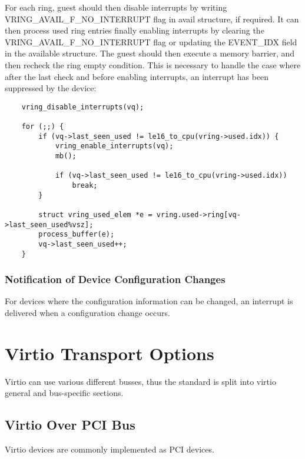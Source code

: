 For each ring, guest should then disable interrupts by writing
VRING_AVAIL_F_NO_INTERRUPT flag in avail structure, if required.
It can then process used ring entries finally enabling interrupts
by clearing the VRING_AVAIL_F_NO_INTERRUPT flag or updating the
EVENT_IDX field in the available structure.  The guest should then
execute a memory barrier, and then recheck the ring empty
condition. This is necessary to handle the case where after the
last check and before enabling interrupts, an interrupt has been
suppressed by the device:

\begin{lstlisting}
	vring_disable_interrupts(vq);

	for (;;) {
		if (vq->last_seen_used != le16_to_cpu(vring->used.idx)) {
			vring_enable_interrupts(vq);
			mb();

			if (vq->last_seen_used != le16_to_cpu(vring->used.idx))
				break;
		}

		struct vring_used_elem *e = vring.used->ring[vq->last_seen_used%vsz];
		process_buffer(e);
		vq->last_seen_used++;
	}
\end{lstlisting}

\subsection{Notification of Device Configuration Changes}\label{sec:General Initialization And Device Operation / Device Operation / Notification of Device Configuration Changes}

For devices where the configuration information can be changed, an
interrupt is delivered when a configuration change occurs.



\chapter{Virtio Transport Options}\label{sec:Virtio Transport Options}

Virtio can use various different busses, thus the standard is split
into virtio general and bus-specific sections.

\section{Virtio Over PCI Bus}\label{sec:Virtio Transport Options / Virtio Over PCI Bus}

Virtio devices are commonly implemented as PCI devices.

